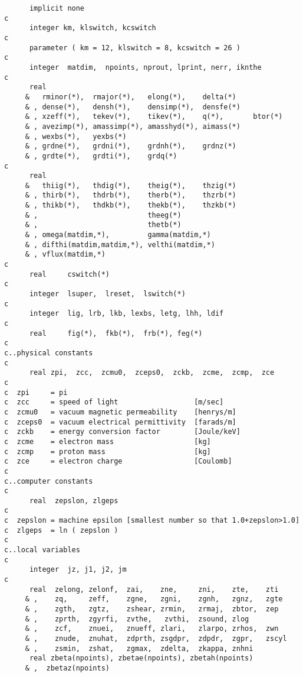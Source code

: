 \begin{verbatim}
      implicit none
c
      integer km, klswitch, kcswitch
c
      parameter ( km = 12, klswitch = 8, kcswitch = 26 )
c
      integer  matdim,  npoints, nprout, lprint, nerr, iknthe
c
      real
     &   rminor(*),  rmajor(*),   elong(*),    delta(*)
     & , dense(*),   densh(*),    densimp(*),  densfe(*)
     & , xzeff(*),   tekev(*),    tikev(*),    q(*),       btor(*)
     & , avezimp(*), amassimp(*), amasshyd(*), aimass(*)
     & , wexbs(*),   yexbs(*)
     & , grdne(*),   grdni(*),    grdnh(*),    grdnz(*)
     & , grdte(*),   grdti(*),    grdq(*)
c
      real
     &   thiig(*),   thdig(*),    theig(*),    thzig(*)
     & , thirb(*),   thdrb(*),    therb(*),    thzrb(*)
     & , thikb(*),   thdkb(*),    thekb(*),    thzkb(*)
     & ,                          theeg(*)
     & ,                          thetb(*)
     & , omega(matdim,*),         gamma(matdim,*)
     & , difthi(matdim,matdim,*), velthi(matdim,*)
     & , vflux(matdim,*)
c
      real     cswitch(*)
c
      integer  lsuper,  lreset,  lswitch(*)
c
      integer  lig, lrb, lkb, lexbs, letg, lhh, ldif
c
      real     fig(*),  fkb(*),  frb(*), feg(*)
c
c..physical constants
c
      real zpi,  zcc,  zcmu0,  zceps0,  zckb,  zcme,  zcmp,  zce
c
c  zpi     = pi
c  zcc     = speed of light                  [m/sec]
c  zcmu0   = vacuum magnetic permeability    [henrys/m]
c  zceps0  = vacuum electrical permittivity  [farads/m]
c  zckb    = energy conversion factor        [Joule/keV]
c  zcme    = electron mass                   [kg]
c  zcmp    = proton mass                     [kg]
c  zce     = electron charge                 [Coulomb]
c
c..computer constants
c
      real  zepslon, zlgeps
c
c  zepslon = machine epsilon [smallest number so that 1.0+zepslon>1.0]
c  zlgeps  = ln ( zepslon )
c
c..local variables
c
      integer  jz, j1, j2, jm
c
      real  zelong, zelonf,  zai,    zne,     zni,    zte,    zti
     & ,    zq,     zeff,    zgne,   zgni,    zgnh,   zgnz,   zgte
     & ,    zgth,   zgtz,    zshear, zrmin,   zrmaj,  zbtor,  zep
     & ,    zprth,  zgyrfi,  zvthe,   zvthi,  zsound, zlog
     & ,    zcf,    znuei,   znueff, zlari,   zlarpo, zrhos,  zwn
     & ,    znude,  znuhat,  zdprth, zsgdpr,  zdpdr,  zgpr,   zscyl
     & ,    zsmin,  zshat,   zgmax,  zdelta,  zkappa, znhni
      real zbeta(npoints), zbetae(npoints), zbetah(npoints)
     & ,  zbetaz(npoints)


\end{verbatim}
